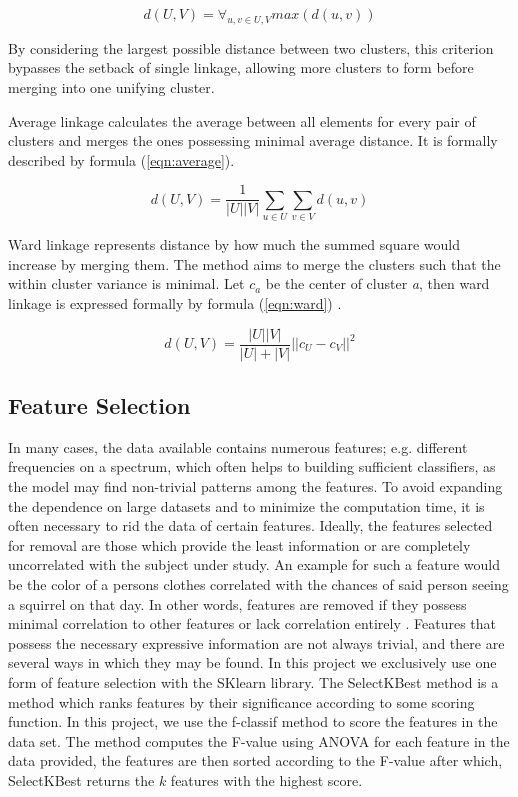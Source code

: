 \begin{equation}
\label{eqn:complete}
d(U, V) = \forall_{u, v \in U, V} max(d(u, v))
\end{equation}

By considering the largest possible distance between two clusters, this criterion bypasses the setback of single linkage, allowing more clusters to form before merging into one unifying cluster.

Average linkage calculates the average between all elements for every pair of clusters and merges the ones possessing minimal average distance. It is formally described by formula (\ref{eqn:average}).

\begin{equation}
\label{eqn:average}
d(U, V) = \frac{1}{|U||V|}\sum\limits_{u\in U} \sum\limits_{v\in V}  d(u, v)
\end{equation}

Ward linkage represents distance by how much the summed square would increase by merging them. The method aims to merge the clusters such that the within cluster variance is minimal. Let $c_a$ be the center of cluster \textit{a}, then ward linkage is expressed formally by formula (\ref{eqn:ward}) \cite{shalizi2009distances}.


\begin{equation}
\label{eqn:ward}
d(U, V) = \frac{|U||V|}{|U|+|V|}||c_U - c_V||^2
\end{equation}



\subsection{Feature Selection}

In many cases, the data available contains numerous features; e.g. different frequencies on a spectrum, which often helps to building sufficient classifiers, as the model may find non-trivial patterns among the features. To avoid expanding the dependence on large datasets and to minimize the computation time, it is often necessary to rid the data of certain features.  
Ideally, the features selected for removal are those which provide the least information or are completely uncorrelated with the subject under study. An example for such a feature would be the color of a persons clothes correlated with the chances of said person seeing a squirrel on that day. In other words, features are removed if they possess minimal correlation to other features or lack correlation entirely \cite{dash1997feature}. Features that possess the necessary expressive information are not always trivial, and there are several ways in which they may be found. In this project we exclusively use one form of feature selection with the SKlearn library. The SelectKBest method is a method which ranks features by their significance according to some scoring function. In this project, we use the f-classif method to score the features in the data set. The method computes the F-value using ANOVA for each feature in the data provided, the features are then sorted according to the F-value after which, SelectKBest returns the $k$ features with the highest score.


